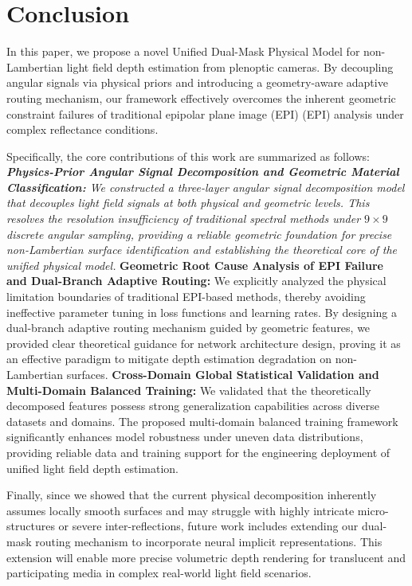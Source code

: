 \section{Conclusion}


In this paper, we propose a novel Unified Dual-Mask Physical Model for non-Lambertian light field depth estimation from plenoptic cameras. By decoupling angular signals via physical priors and introducing a geometry-aware adaptive routing mechanism, our framework effectively overcomes the inherent geometric constraint failures of traditional epipolar plane image (EPI) (EPI) analysis under complex reflectance conditions. 

Specifically, the core contributions of this work are summarized as follows:
\textit{ \textbf{Physics-Prior Angular Signal Decomposition and Geometric Material Classification:} We constructed a three-layer angular signal decomposition model that decouples light field signals at both physical and geometric levels. This resolves the resolution insufficiency of traditional spectral methods under $9 \times 9$ discrete angular sampling, providing a reliable geometric foundation for precise non-Lambertian surface identification and establishing the theoretical core of the unified physical model.
} \textbf{Geometric Root Cause Analysis of EPI Failure and Dual-Branch Adaptive Routing:} We explicitly analyzed the physical limitation boundaries of traditional EPI-based methods, thereby avoiding ineffective parameter tuning in loss functions and learning rates. By designing a dual-branch adaptive routing mechanism guided by geometric features, we provided clear theoretical guidance for network architecture design, proving it as an effective paradigm to mitigate depth estimation degradation on non-Lambertian surfaces.
\textbf{Cross-Domain Global Statistical Validation and Multi-Domain Balanced Training:} We validated that the theoretically decomposed features possess strong generalization capabilities across diverse datasets and domains. The proposed multi-domain balanced training framework significantly enhances model robustness under uneven data distributions, providing reliable data and training support for the engineering deployment of unified light field depth estimation.

Finally, since we showed that the current physical decomposition inherently assumes locally smooth surfaces and may struggle with highly intricate micro-structures or severe inter-reflections, future work includes extending our dual-mask routing mechanism to incorporate neural implicit representations. This extension will enable more precise volumetric depth rendering for translucent and participating media in complex real-world light field scenarios.



